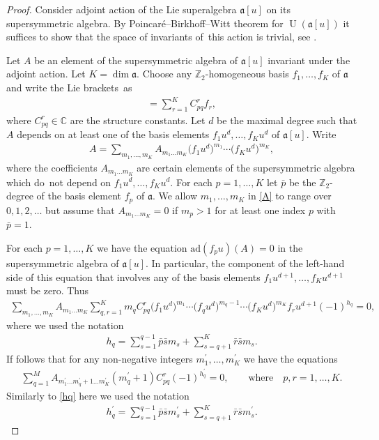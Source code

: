 \documentclass[pdftex]{sigma}
\numberwithin{equation}{section}
\def\a{\mathfrak{a}}
\def\bp{{\bar p }}
\def\br{{\bar r }}
\def\bs{{\bar s }}
\def\CC{{\mathbb{C}}}
\def\Ua{\operatorname{U}(\a [u])}
\def\ZZ{\mathbb{Z}}
\begin{document}
\begin{proof}
Consider adjoint action of the Lie superalgebra $\a [u]$
on its supersymmetric algebra. By
Poincar\'e--Birkhoff--Witt theorem for $\Ua$
it suffices to show that the space
of invariants of~this action is trivial,
see \cite[Theorem~5.15]{MM}.

Let $A$ be an element of the supersymmetric algebra of $\a [u]$
invariant under the adjoint action. Let $K=\dim\a $.
Choose any $\ZZ_2 $-homogeneous basis $f_1,\dots,f_K$ of $\a$ and
write the Lie brackets~as
\begin{gather*}
[ f_p ,f_q ]=\sum_{r=1}^K C_{pq}^{r} f_r,
\end{gather*}
where $C_{pq}^{r}\in\CC$ are the structure constants.
Let $d$ be the maximal degree such that $A$ depends on at least one
of the basis
elements $f_1 u^{d},\dots, f_K u^{d}$ of $\a [u] $. Write
\begin{gather}
\label{A}
A =\sum_{m_1,\dots,m_K}A_{m_1\dots m_K}
\big( f_1 u^{d} \big)^{m_1}\cdots\big( f_K u^{d} \big)^{m_K},
\end{gather}
where the coefficients $A_{m_1\dots m_K}$ are certain elements
of the supersymmetric algebra which do~not depend
on $f_1 u^{d},\dots, f_K u^{d} $.
For each $p=1,\dots, K$ let $\bp$ be the $\ZZ_2 $-degree of the basis element
$f_{p}$ of $\a $. We allow $m_1,\dots, m_K$ in \eqref{A}
to range over $0,1,2, \dots$ but assume that $A_{m_1\dots m_K}=0$
if $m_{p}>1$ for at least one index $p$ with $\bp=1 $.

For each $p=1,\dots, K$ we have the equation
$\text{ad} ( f_p u )(A)=0$ in the supersymmetric algebra
of $\a [u] $. In particular,
the component of the left-hand side of this equation
that involves any of the basis elements
$f_1 u^{d+1},\dots, f_K u^{d+1}$ must be zero. Thus
\begin{gather*}
\sum_{m_1,\dots,m_K}A_{m_1\dots m_K}
\sum_{q,r=1}^K
m_{q} C_{pq}^{r}
\big( f_1 u^{d} \big)^{m_1}
\cdots
\big( f_q u^{d} \big)^{m_{q}-1}
\cdots
\big( f_K u^{d} \big)^{m_K}
f_r u^{d+1}
(-1)^{h_{q}}=0,
\end{gather*}
where we used the notation
\begin{gather}\label{hq}
h_{q}=
\sum_{s=1}^{q-1} \bp \bs m_{s}
 + \sum_{s=q+1}^K\br \bs m_{s} .
\end{gather}
If follows that for any non-negative integers
$m_1^{\prime},\dots,m_K^{\prime}$ we have the equations
\begin{gather}\label{ad}
\sum_{q=1}^M
A_{m_1^{\prime}\dots m^{\prime}_q+1\dots m^{\prime}_K}
(m^{\prime}_q+1) C_{pq}^{r} (-1)^{h_{q}^{\prime}}=0,
\qquad\text{where}\quad
p ,r=1,\dots, K .
\end{gather}
Similarly to \eqref{hq} here we used the notation
\begin{gather*}
h_{q}^{\prime}=\sum_{s=1}^{q-1} \bp \bs m_{s}^{\prime}
 + \sum_{s=q+1}^K\br \bs m_{s}^{\prime} .
\end{gather*}


\end{proof}
\end{document}
